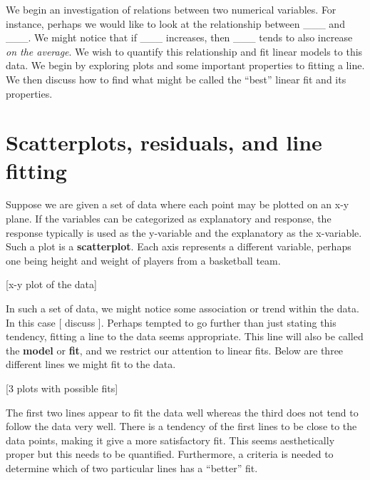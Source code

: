 We begin an investigation of relations between two numerical variables. For instance, perhaps we would like to look at the relationship between \_\_\_ and \_\_\_. We might notice that if \_\_\_ increases, then \_\_\_ tends to also increase \textit{on the average}. We wish to quantify this relationship and fit linear models to this data. We begin by exploring plots and some important properties to fitting a line. We then discuss how to find what might be called the ``best'' linear fit and its properties. \\

\section{Scatterplots, residuals, and line fitting}

Suppose we are given a set of data where each point may be plotted on an x-y plane. If the variables can be categorized as explanatory and response, the response typically is used as the y-variable and the explanatory as the x-variable. Such a plot is a \textbf{scatterplot}. Each axis represents a different variable, perhaps one being height and weight of players from a basketball team.

[x-y plot of the data]

In such a set of data, we might notice some association or trend within the data. In this case [ discuss ]. Perhaps tempted to go further than just stating this tendency, fitting a line to the data seems appropriate. This line will also be called the \textbf{model} or \textbf{fit}, and we restrict our attention to linear fits. Below are three different lines we might fit to the data.

[3 plots with possible fits]

The first two lines appear to fit the data well whereas the third does not tend to follow the data very well. There is a tendency of the first lines to be close to the data points, making it give a more satisfactory fit. This seems aesthetically proper but this needs to be quantified. Furthermore, a criteria is needed to determine which of two particular lines has a ``better'' fit. \\

